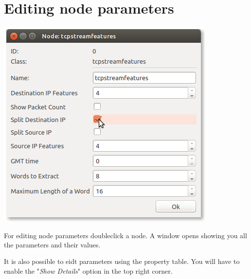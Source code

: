 \documentclass[12pt, accentcolor=tud1b]{tudreport}
\begin{document}
\section*{Editing node parameters}

\begin{minipage}{0.5\textwidth}
\includegraphics[width=\textwidth]{edit_window_cut}
\end{minipage}
\begin{minipage}[t]{0.5\textwidth}\vspace{-120pt}For editing node parameters doubleclick a node. A window opens showing you all the parameters and their values. \end{minipage}\newpage \noindent
It is also possible to eidt parameters using the property table. You will have to enable the "\emph{Show Details}" option in the top right corner.
\end{document}
